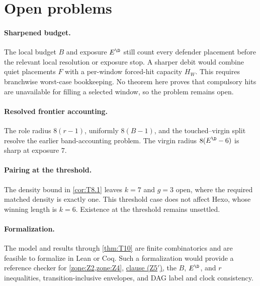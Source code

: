 \section{Open problems}
\label{sec:open-problems}

\paragraph{Sharpened budget.}
The local budget $B$ and exposure $E^\D$ still count every defender placement
before the relevant local resolution or exposure stop.  A sharper debit would
combine quiet placements $F$ with a per-window forced-hit capacity $H_W$.
This requires branchwise worst-case bookkeeping.  No theorem here proves that
compulsory hits are unavailable for filling a selected window, so the problem
remains open.

\paragraph{Resolved frontier accounting.}
The role radius $8(r-1)$, uniformly $8(B-1)$, and the touched--virgin split
resolve the earlier band-accounting problem.  The virgin radius
$8(E^\D-6)$ is sharp at exposure $7$.

\paragraph{Pairing at the threshold.}
The density bound in \cref{cor:T8.1} leaves $k=7$ and $g=3$ open, where the
required matched density is exactly one.  This threshold case does not affect
Hexo, whose winning length is $k=6$.  Existence at the threshold remains
unsettled.

\paragraph{Formalization.}
The model and results through \cref{thm:T10} are finite combinatorics and are
feasible to formalize in Lean or Coq.  Such a formalization would provide a
reference checker for \cref{zone:Z2,zone:Z4},
\hyperref[zone:Z5prime]{clause \textup{(Z5$'$)}}, the $B$, $E^\D$, and $r$
inequalities, transition-inclusive envelopes, and DAG label and clock
consistency.
